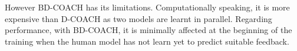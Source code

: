 However BD-COACH has its limitations. Computationally speaking, it is more expensive than D-COACH as two models are learnt in parallel. Regarding performance, with BD-COACH, it is minimally affected at the beginning of the training when the human model has not learn yet to predict suitable feedback.


